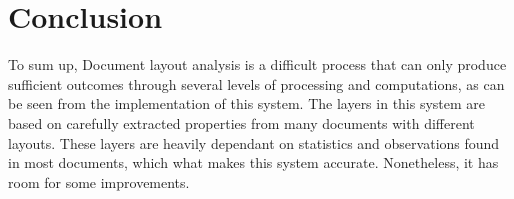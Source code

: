 \documentclass[12pt]{report}
\begin{document}
%
%


    \chapter{Conclusion}

    To sum up, Document layout analysis is a difficult process that can only produce sufficient outcomes through several
    levels of processing and computations, as can be seen from the implementation of this system.
    The layers in this system are based on carefully extracted properties from many documents with different layouts.
    These layers are heavily dependant on statistics and observations found in most documents, which what makes this
    system accurate.
    Nonetheless, it has room for some improvements.
\end{document}
